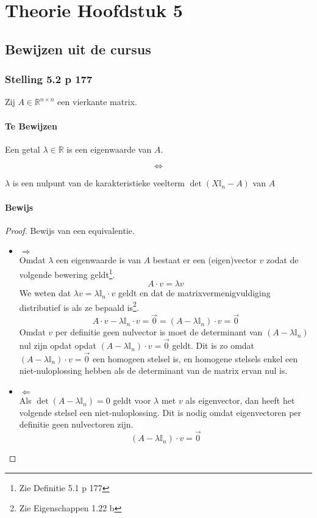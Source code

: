 \documentclass[lineaire_algebra_oplossingen.tex]{subfiles}
\begin{document}
\chapter{Theorie Hoofdstuk 5}
\section{Bewijzen uit de cursus}

\subsection{Stelling 5.2 p 177}
\label{5.2}
Zij $A\in \mathbb{R}^{n\times n}$ een vierkante matrix.

\subsubsection*{Te Bewijzen}
\begin{center}
Een getal $\lambda\in\mathbb{R}$ is een eigenwaarde van $A$.
\end{center}
\[\Leftrightarrow\]
\begin{center}
$\lambda$ is een nulpunt van de karakteristieke veelterm $\det(X\mathbb{I}_n - A)$ van $A$
\end{center}

\subsubsection*{Bewijs}
\begin{proof}
Bewijs van een equivalentie.
\begin{itemize}
\item $\Rightarrow$\\
Omdat $\lambda$ een eigenwaarde is van $A$ bestaat er een (eigen)vector $v$ zodat de volgende bewering geldt\footnote{Zie Definitie 5.1 p 177}.
\[
A\cdot v = \lambda v
\]
We weten dat $\lambda v =  \lambda \mathbb{I}_n \cdot v$ geldt en dat de matrixvermenigvuldiging distributief is als ze bepaald is\footnote{Zie Eigenschappen 1.22 b}.
\[
A\cdot v - \lambda \mathbb{I}_n \cdot v = \vec{0} = (A-\lambda\mathbb{I}_n)\cdot v = \vec{0}
\]
Omdat $v$ per definitie geen nulvector is moet de determinant van $(A-\lambda\mathbb{I}_n)$ nul zijn opdat opdat $(A-\lambda\mathbb{I}_n)\cdot v = \vec{0}$ geldt.
Dit is zo omdat $(A-\lambda\mathbb{I}_n)\cdot v = \vec{0}$ een homogeen stelsel is, en homogene stelsels enkel een niet-nuloplossing hebben als de determinant van de matrix ervan nul is.

\item $\Leftarrow$\\
Als $\det(A-\lambda\mathbb{I}_n) = 0$ geldt voor $\lambda$ met $v$ als eigenvector, dan heeft het volgende stelsel een niet-nuloplossing. Dit is nodig omdat eigenvectoren per definitie geen nulvectoren zijn.
\[
(A-\lambda\mathbb{I}_n)\cdot v = \vec{0}
\]
\end{itemize}
\end{proof}
\end{document}
